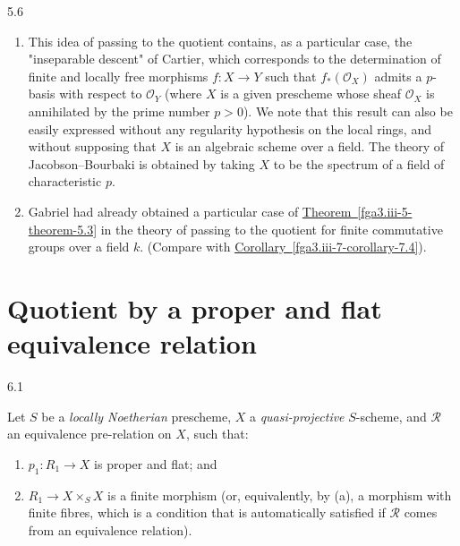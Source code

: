 \begin{remarks}{5.6}
\begin{enumerate}
    \item{}This idea of passing to the quotient contains, as a particular case, the "inseparable descent" of Cartier, which corresponds to the determination of finite and locally free morphisms \(f\colon  X\to  Y\) such that \(f_*(\mathcal {O}_X)\) admits a \(p\)-basis with respect to \(\mathcal {O}_Y\) (where \(X\) is a given prescheme whose sheaf \(\mathcal {O}_X\) is annihilated by the prime number \(p>0\)).
      We note that this result can also be easily expressed without any regularity hypothesis on the local rings, and without supposing that \(X\) is an algebraic scheme over a field.
      The theory of Jacobson–Bourbaki is obtained by taking \(X\) to be the spectrum of a field of characteristic \(p\).

    \item{}Gabriel had already obtained a particular case of \hyperref[fga3.iii-5-theorem-5.3]{Theorem~\ref*{fga3.iii-5-theorem-5.3}} in the theory of passing to the quotient for finite commutative groups over a field \(k\).
      (Compare with \hyperref[fga3.iii-7-corollary-7.4]{Corollary~\ref*{fga3.iii-7-corollary-7.4}}).\end{enumerate}\end{remarks}\chapter{Quotient by a proper and flat equivalence relation}\thispagestyle{fancy}\label{fga3.iii-6}\begin{theorem}{6.1}\label{fga3.iii-6-theorem-6.1}\skipsinglepar\par{}Let \(S\) be a \emph{locally Noetherian} prescheme, \(X\) a \emph{quasi-projective} \(S\)-scheme, and \(\mathcal {R}\) an equivalence pre-relation on \(X\), such that:

    
 \begin{enumerate}
      
 \item[a.]
        \(p_1\colon  R_1\to  X\) is proper and flat; and
      


      
 \item[b.]
        \(R_1\to  X\times _S X\) is a finite morphism (or, equivalently, by (a), a morphism with finite fibres, which is a condition that is automatically satisfied if \(\mathcal {R}\) comes from an equivalence relation).
      

    \end{enumerate}



\end{theorem}
